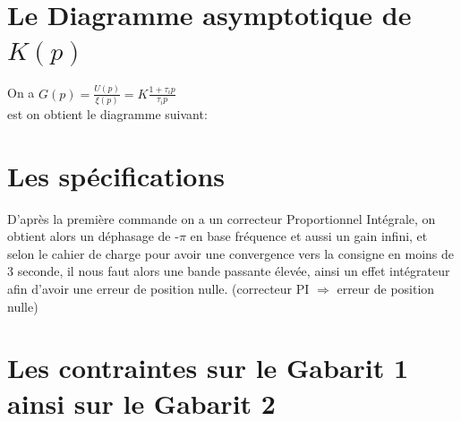 \documentclass[12pt, a4paper, openany]{report}
\begin{document}
 
 \section{Le Diagramme asymptotique de $K(p)$ }  %
 
 On a  $G(p)=\frac {U(p)}{\xi(p)}=K\frac {1+\tau_{i}p}{\tau_{i}p}$\\
 
 est on obtient le diagramme suivant:\\
 
 
 \section{Les spécifications} %

 D’après la première commande on a un correcteur Proportionnel Intégrale, on obtient alors un déphasage de -$\pi$ en base fréquence et aussi un gain infini, et selon le cahier de charge pour avoir une convergence vers la consigne en moins de 3 seconde, il nous faut alors une bande passante élevée, ainsi un effet intégrateur afin d'avoir une erreur de position nulle. (correcteur PI $\Rightarrow$ erreur de position nulle)
 
 
 \section{Les contraintes sur le Gabarit 1 ainsi sur le Gabarit 2}  %
 
\end{document}

